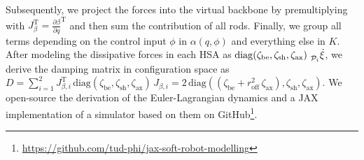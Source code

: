 Subsequently, we project the forces into the virtual backbone by premultiplying with $J_\beta^\mathrm{T} = \frac{\partial \beta}{\partial q}^\mathrm{T}$ and then sum the contribution of all rods.
Finally, we group all terms depending on the control input $\phi$ in $\alpha(q,\phi)$ and everything else in $K$.
After modeling the dissipative forces in each \gls{HSA} as $\mathrm{diag}(\zeta_\mathrm{be}, \zeta_{\mathrm{sh}}, \zeta_{\mathrm{ax}}) \, \prescript{}{\mathcal{P}_i}{\dot{\xi}}$, we derive the damping matrix in configuration space as $D = \sum_{i=1}^{2} J_{\beta,i}^\mathrm{T} \, \mathrm{diag}(\zeta_\mathrm{be}, \zeta_{\mathrm{sh}}, \zeta_{\mathrm{ax}}) \, J_{\beta,i} = 2 \, \mathrm{diag}\left ( (\zeta_\mathrm{be} + r_\mathrm{off}^2 \, \zeta_\mathrm{ax} ), \zeta_{\mathrm{sh}}, \zeta_{\mathrm{ax}} \right)$.
We open-source the derivation of the Euler-Lagrangian dynamics and a JAX implementation of a simulator based on them on GitHub\footnote{\url{https://github.com/tud-phi/jax-soft-robot-modelling}}.

